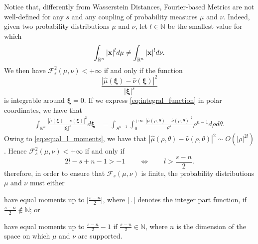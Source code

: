 \documentclass{article}
\newcommand{\N}{\mathbb N}
\def\N{\mathbb{N}}
\def\bx{{\bf x}}
\def\bxi{{\pmb\xi}}
\def \erre{\mathbb{R}}
\def \enne{\mathbb{N}}
\begin{document}
% 
Notice that, differently from Wasserstein Distances, Fourier-based Metrics are not well-defined for any $s$ and any coupling of probability measures $\mu$ and $\nu$.
% 
Indeed, given two probability distributions $\mu$ and $\nu$, let $l\in\enne$ be the smallest value for which 
% 
\begin{equation}
    \label{eq:equal_l_moments}
     \int_{\erre^n}|\bx|^ld\mu \neq \int_{\erre^n}|\bx|^ld\nu.    
\end{equation}
% 
We then have $\mathcal{F}_{s}^2(\mu,\nu)<+\infty$ if and only if the function 
\begin{equation}
    \label{eq:integral_function}
    \frac{|\hat\mu(\bxi)-\hat\nu(\bxi)|^2}{|\bxi|^s}    
\end{equation}
is integrable around $\bxi=0$.
% 
If we express \eqref{eq:integral_function} in polar coordinates, we have that
\begin{align*}
    \int_{\erre^n}\frac{|\hat\mu(\bxi)-\hat\nu(\bxi)|^2}{|\bxi|^s}d\bxi&=\int_{S^{n-1}}\int_{0}^{+\infty}\frac{|\hat\mu(\rho,\theta)-\hat\nu(\rho,\theta)|^2}{\rho^s}\rho^{n-1}d\rho d\theta.
\end{align*}
% 
Owing to \eqref{eq:equal_l_moments}, we have that $|\hat\mu(\rho,\theta)-\hat\nu(\rho,\theta)|^2\sim O(|\rho|^{2l})$.
% 
Hence $\mathcal{F}^2_{s}(\mu,\nu)<+\infty$ if and only if
\[
    2l-s+n-1 >- 1 \quad\quad \Leftrightarrow \quad\quad l>\frac{s-n}{2}.
\]
% 
therefore, in order to ensure that $\mathcal{F}_s(\mu,\nu)$ is finite, the probability distributions $\mu$ and $\nu$ must either
\begin{enumerate*}[label=(\roman*)]
    \item have equal moments up to $\Big[\frac{s-n}{2}\Big]$, where $\Big[\,.\,\Big]$ denotes the integer part function, if $\frac{s-n}{2} \not \in \N$; or
    \item have equal moments up to $\frac{s-n}{2}-1$ if $\frac{s-n}{2} \in \N$, where $n$ is the dimension of the space on which $\mu$ and $\nu$ are supported.  
\end{enumerate*}
    





% 
\end{document}
